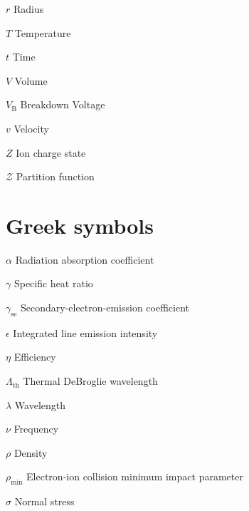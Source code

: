 \begin{multicols}{2}
\begin{nomlist}
        \item[$r$]              Radius 
        \item[$T$]              Temperature
        \item[$t$]              Time
        \item[$V$]              Volume
        \item[$V_\mathrm{B}$]   Breakdown Voltage
        \item[$v$]              Velocity
        \item[$Z$]              Ion charge state
        \item[$\mathcal{Z}$]    Partition function
    \end{nomlist}

    \section*{Greek symbols}
    \begin{nomlist}
        \item[$\alpha$]         Radiation absorption coefficient %
        \item[$\gamma$]         Specific heat ratio
        \item[$\gamma_\mathrm{se}$]         Secondary-electron-emission coefficient
        \item[$\epsilon$]       Integrated line emission intensity 
        \item[$\eta$]           Efficiency 
        \item[$\Lambda_\mathrm{th}$]        Thermal DeBroglie wavelength
        \item[$\lambda$]        Wavelength
        \item[$\nu$]            Frequency
        \item[$\rho$]           Density
        \item[$\rho_\mathrm{min}$]  Electron-ion collision minimum impact parameter
        \item[$\sigma$]         Normal stress
    \end{nomlist}


\end{multicols}
